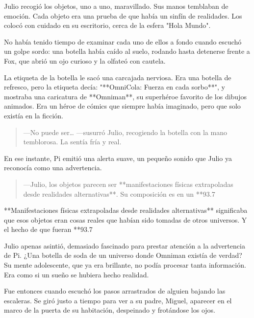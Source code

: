 \documentclass[a4paper,12pt]{book}
\begin{document}
Julio recogió los objetos, uno a uno, maravillado. Sus manos temblaban de emoción. Cada objeto era una prueba de que había un sinfín de realidades. Los colocó con cuidado en su escritorio, cerca de la esfera "Hola Mundo".

No había tenido tiempo de examinar cada uno de ellos a fondo cuando escuchó un golpe sordo: una botella había caído al suelo, rodando hasta detenerse frente a Fox, que abrió un ojo curioso y la olfateó con cautela.

La etiqueta de la botella le sacó una carcajada nerviosa. Era una botella de refresco, pero la etiqueta decía: "**OmniCola: Fuerza en cada sorbo**", y mostraba una caricatura de **Omniman**, su superhéroe favorito de los dibujos animados. Era un héroe de cómics que siempre había imaginado, pero que solo existía en la ficción.

\begin{quote}
    —No puede ser… —susurró Julio, recogiendo la botella con la mano temblorosa. La sentía fría y real.
\end{quote}

En ese instante, Pi emitió una alerta suave, un pequeño sonido que Julio ya reconocía como una advertencia.

\begin{quote}
    —Julio, los objetos parecen ser **manifestaciones físicas extrapoladas desde realidades alternativas**. Su composición es en un **93.7%
\end{quote}

**Manifestaciones físicas extrapoladas desde realidades alternativas** significaba que esos objetos eran cosas reales que habían sido tomadas de otros universos. Y el hecho de que fueran **93.7%

Julio apenas asintió, demasiado fascinado para prestar atención a la advertencia de Pi. ¿Una botella de soda de un universo donde Omniman existía de verdad? Su mente adolescente, que ya era brillante, no podía procesar tanta información. Era como si un sueño se hubiera hecho realidad.

Fue entonces cuando escuchó los pasos arrastrados de alguien bajando las escaleras. Se giró justo a tiempo para ver a su padre, Miguel, aparecer en el marco de la puerta de su habitación, despeinado y frotándose los ojos.
\end{document}
